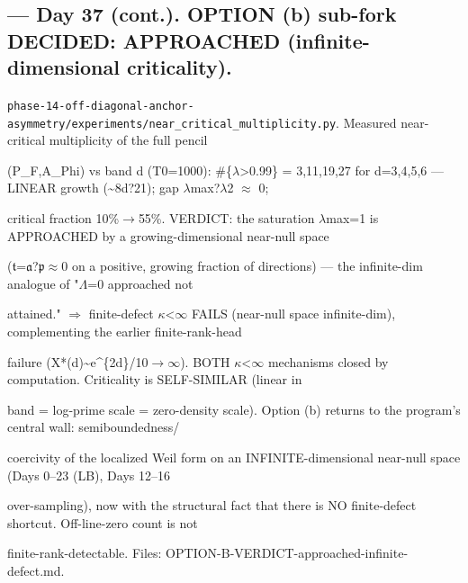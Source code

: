 \documentclass[10pt]{article}
\begin{document}
\subsection*{ --- Day 37 (cont.). OPTION (b) sub-fork DECIDED: APPROACHED (infinite-dimensional criticality).}
\texttt{phase-14-off-diagonal-anchor-asymmetry/experiments/near\_critical\_multiplicity.py}. Measured near-critical multiplicity of the full pencil\par
(P\_F,A\_Phi) vs band d (T0=1000): \#\{\ensuremath{\lambda}>0.99\} = 3,11,19,27 for d=3,4,5,6 --- LINEAR growth (\textasciitilde{}8d?21); gap \ensuremath{\lambda}max?\ensuremath{\lambda}2 \ensuremath{\approx} 0;\par
critical fraction 10\%\ensuremath{\to}55\%. VERDICT: the saturation \ensuremath{\lambda}max=1 is APPROACHED by a growing-dimensional near-null space\par
(\ensuremath{\mathfrak{t}}=\ensuremath{\mathfrak{a}}?\ensuremath{\mathfrak{p}}\ensuremath{\approx}0 on a positive, growing fraction of directions) --- the infinite-dim analogue of "\ensuremath{\Lambda}=0 approached not\par
attained." \ensuremath{\Rightarrow} finite-defect \ensuremath{\kappa}<\ensuremath{\infty} FAILS (near-null space infinite-dim), complementing the earlier finite-rank-head\par
failure (X*(d)\textasciitilde{}e\textasciicircum{}\{2d\}/10\ensuremath{\to}\ensuremath{\infty}). BOTH \ensuremath{\kappa}<\ensuremath{\infty} mechanisms closed by computation. Criticality is SELF-SIMILAR (linear in\par
band = log-prime scale = zero-density scale). Option (b) returns to the program's central wall: semiboundedness/\par
coercivity of the localized Weil form on an INFINITE-dimensional near-null space (Days 0--23 (LB), Days 12--16\par
over-sampling), now with the structural fact that there is NO finite-defect shortcut. Off-line-zero count is not\par
finite-rank-detectable. Files: OPTION-B-VERDICT-approached-infinite-defect.md.\par
\end{document}
